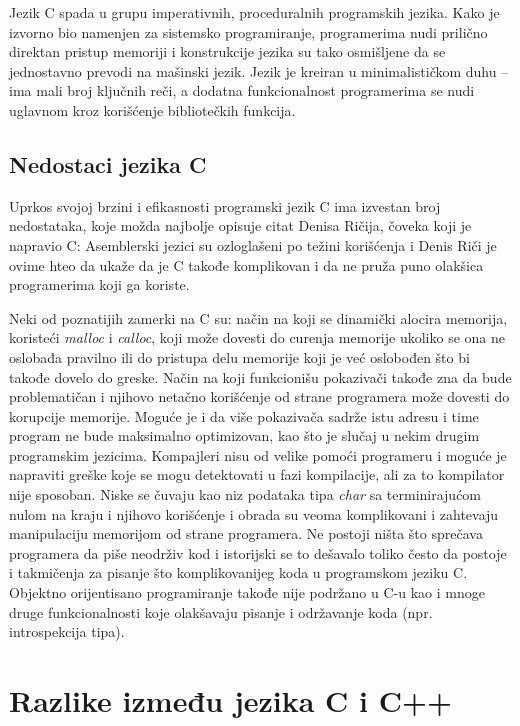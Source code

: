 \documentclass[a4paper]{article}
\begin{document}
Jezik C spada u grupu imperativnih, proceduralnih programskih jezika. Kako je izvorno bio namenjen za sistemsko programiranje, programerima nudi prilično direktan pristup memoriji i konstrukcije jezika su tako osmišljene da se jednostavno prevodi na mašinski jezik. Jezik je kreiran u minimalističkom duhu -- ima mali broj ključnih reči, a dodatna funkcionalnost programerima se nudi uglavnom kroz korišćenje bibliotečkih funkcija.\cite{programiranje1}

\subsection{Nedostaci jezika C}
Uprkos svojoj brzini i efikasnosti programski jezik C ima izvestan broj nedostataka, koje možda najbolje opisuje citat Denisa Ričija, čoveka koji je napravio C:  Asemblerski jezici su ozloglašeni po težini korišćenja i Denis Riči je ovime hteo da ukaže da je C takođe komplikovan i da ne pruža puno olakšica programerima koji ga koriste.

Neki od poznatijih zamerki na C su: način na koji se dinamički alocira memorija, koristeći {\em malloc} i {\em calloc}, koji može dovesti do curenja memorije ukoliko se ona ne oslobađa pravilno ili do pristupa delu memorije koji je već oslobođen što bi takođe dovelo do greske. Način na koji funkcionišu pokazivači takođe zna da bude problematičan i njihovo netačno korišćenje od strane programera može dovesti do korupcije memorije. Moguće je i da više pokazivača sadrže istu adresu i time program ne bude maksimalno optimizovan, kao što je slučaj u nekim drugim programskim jezicima. Kompajleri nisu od velike pomoći programeru i moguće je napraviti greške koje se mogu detektovati u fazi kompilacije, ali za to kompilator nije sposoban. Niske se čuvaju kao niz podataka tipa {\em char} sa terminirajućom nulom na kraju i njihovo korišćenje i obrada su veoma komplikovani i zahtevaju manipulaciju memorijom od strane programera. Ne postoji ništa što sprečava programera da piše neodrživ kod i istorijski se to dešavalo toliko često da postoje i takmičenja za pisanje što komplikovanijeg koda u programskom jeziku C. Objektno orijentisano programiranje takođe nije podržano u C-u kao i mnoge druge funkcionalnosti koje olakšavaju pisanje i održavanje koda (npr. introspekcija tipa).

\section{Razlike između jezika C i C++}
\end{document}
